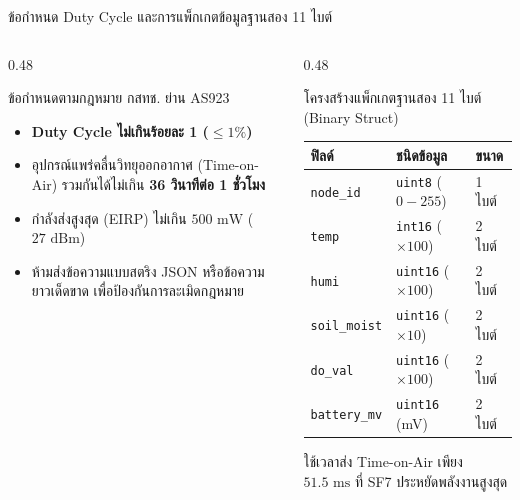 \documentclass[aspectratio=169, 10pt]{beamer}
\begin{document}
\begin{frame}{ข้อกำหนด Duty Cycle และการแพ็กเกตข้อมูลฐานสอง 11 ไบต์}
\begin{columns}[T]
    \begin{column}{0.48\textwidth}
        \begin{mastercard}{ข้อกำหนดตามกฎหมาย กสทช. ย่าน AS923}
            \begin{itemize}
                \item \textbf{Duty Cycle ไม่เกินร้อยละ 1 ($\le 1\%$)}
                \item อุปกรณ์แพร่คลื่นวิทยุออกอากาศ (Time-on-Air) รวมกันได้ไม่เกิน \textbf{36 วินาทีต่อ 1 ชั่วโมง}
                \item กำลังส่งสูงสุด (EIRP) ไม่เกิน $500\text{ mW}$ ($27\text{ dBm}$)
                \item ห้ามส่งข้อความแบบสตริง JSON หรือข้อความยาวเด็ดขาด เพื่อป้องกันการละเมิดกฎหมาย
            \end{itemize}
        \end{mastercard}
    \end{column}
    \begin{column}{0.48\textwidth}
        \begin{goldcard}{โครงสร้างแพ็กเกตฐานสอง 11 ไบต์ (Binary Struct)}
            \begin{tabularx}{\textwidth}{lXl}
                \toprule
                \textbf{\color{rbruNavy} ฟิลด์} & \textbf{\color{rbruNavy} ชนิดข้อมูล} & \textbf{\color{rbruNavy} ขนาด} \\
                \midrule
                \texttt{node\_id} & \texttt{uint8} ($0-255$) & 1 ไบต์ \\
                \texttt{temp} & \texttt{int16} ($\times 100$) & 2 ไบต์ \\
                \texttt{humi} & \texttt{uint16} ($\times 100$) & 2 ไบต์ \\
                \texttt{soil\_moist} & \texttt{uint16} ($\times 10$) & 2 ไบต์ \\
                \texttt{do\_val} & \texttt{uint16} ($\times 100$) & 2 ไบต์ \\
                \texttt{battery\_mv} & \texttt{uint16} (mV) & 2 ไบต์ \\
                \bottomrule
            \end{tabularx}
            \vspace{4pt}
            {\scriptsize ใช้เวลาส่ง Time-on-Air เพียง $51.5\text{ ms}$ ที่ SF7 ประหยัดพลังงานสูงสุด}
        \end{goldcard}
    \end{column}
\end{columns}
\end{frame}
\end{document}
